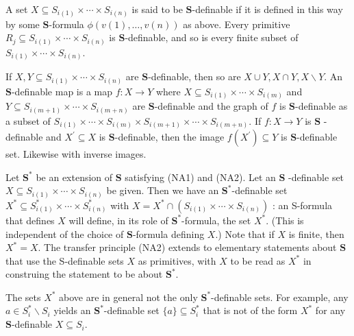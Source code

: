 \documentclass[10pt]{article}
\begin{document}
A set $X \subseteq S_{i(1)} \times \cdots \times S_{i(n)}$ is said to be $\mathbf{S}$-definable if it is defined in this way by some $\mathbf{S}$-formula $\phi(v(1), \ldots, v(n))$ as above. Every primitive $R_{j} \subseteq S_{i(1)} \times \cdots \times S_{i(n)}$ is $\mathbf{S}$-definable, and so is every finite subset of $S_{i(1)} \times \cdots \times S_{i(n)}$.

If $X, Y \subseteq S_{i(1)} \times \cdots \times S_{i(n)}$ are $\mathbf{S}$-definable, then so are $X \cup Y, X \cap Y, X \backslash Y$. An $\mathbf{S}$-definable map is a map $f: X \rightarrow Y$ where $X \subseteq S_{i(1)} \times \cdots \times S_{i(m)}$ and $Y \subseteq S_{i(m+1)} \times \cdots \times S_{i(m+n)}$ are $\mathbf{S}$-definable and the graph of $f$ is $\mathbf{S}$-definable as a subset of $S_{i(1)} \times \cdots \times S_{i(m)} \times S_{i(m+1)} \times \cdots \times S_{i(m+n)}$. If $f: X \rightarrow Y$ is $\mathbf{S}$ -definable and $X^{\prime} \subseteq X$ is $\mathbf{S}$-definable, then the image $f\left(X^{\prime}\right) \subseteq Y$ is $\mathbf{S}$-definable set. Likewise with inverse images.

Let $\mathbf{S}^{*}$ be an extension of $\mathbf{S}$ satisfying (NA1) and (NA2). Let an $\mathbf{S}$ -definable set $X \subseteq S_{i(1)} \times \cdots \times S_{i(n)}$ be given. Then we have an $\mathbf{S}^{*}$-definable set $X^{*} \subseteq S_{i(1)}^{*} \times \cdots \times S_{i(n)}^{*}$ with $X=X^{*} \cap\left(S_{i(1)} \times \cdots \times S_{i(n)}\right)$ : an S-formula that defines $X$ will define, in its role of $\mathbf{S}^{*}$-formula, the set $X^{*}$. (This is independent of the choice of $\mathbf{S}$-formula defining $X$.) Note that if $X$ is finite, then $X^{*}=X$. The transfer principle (NA2) extends to elementary statements about $\mathbf{S}$ that use the S-definable sets $X$ as primitives, with $X$ to be read as $X^{*}$ in construing the statement to be about $\mathbf{S}^{*}$.

The sets $X^{*}$ above are in general not the only $\mathbf{S}^{*}$-definable sets. For example, any $a \in S_{i}^{*} \backslash S_{i}$ yields an $\mathbf{S}^{*}$-definable set $\{a\} \subseteq S_{i}^{*}$ that is not of the form $X^{*}$ for any $\mathbf{S}$-definable $X \subseteq S_{i}$.
\end{document}
